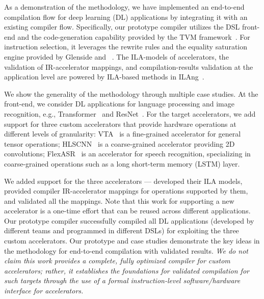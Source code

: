 As a demonstration of the {\TLA} methodology, we have implemented an end-to-end compilation flow for deep learning (DL) applications by integrating it with an existing compiler flow.
%
Specifically, our prototype compiler utilizes the DSL front-end and the code-generation capability provided by the TVM framework~\cite{chen2018tvm}. For instruction selection, it leverages the rewrite rules and the equality saturation engine provided by Glenside and \egg~\cite{smith2021pure,willsey2021egg}.
%
The ILA-models of accelerators, the validation of IR-accelerator mappings, and compilation-results validation at the application level are powered by ILA-based methods in ILAng~\cite{huang2019ilang}.

We show the generality of the {\TLA} methodology through multiple case studies.
%
At the front-end, we consider \AppNum DL applications for language processing and image recognition, e.g., Transformer~\cite{vaswani2017attention} and ResNet~\cite{he2016deep}.
%
For the target accelerators, we add support for three custom accelerators that provide hardware operations at different levels of granularity: 
VTA~\cite{moreau2019hardware} is a fine-grained accelerator for general tensor operations; 
HLSCNN~\cite{whatmough201916nm} is a coarse-grained accelerator providing 2D convolutions; 
FlexASR~\cite{tambe20219} is an accelerator for speech recognition, specializing in coarse-grained operations such as a long short-term memory (LSTM) layer.

We added support for the three accelerators --- developed their ILA models, provided compiler IR-accelerator mappings for operations supported by them, and validated all the mappings.
Note that this work for supporting a new accelerator is a one-time effort that can be reused across different applications.
%
Our prototype compiler successfully compiled all \AppNum DL applications (developed by different teams and programmed in different DSLs) for exploiting the three custom accelerators.
%
%
%
%
Our prototype and case studies demonstrate the key ideas in the {\TLA} methodology for end-to-end compilation with validated results. 
%
\emph{
  We do not claim this work provides a complete, fully optimized compiler for custom accelerators; rather, it establishes the foundations for validated compilation for such targets through the use of a formal instruction-level software/hardware interface for accelerators.
}

